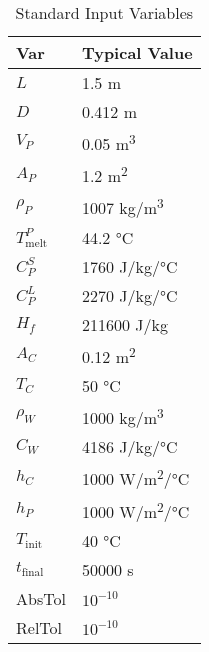 \documentclass[12pt]{article}
\begin{document}
\begin{table}
\renewcommand{\arraystretch}{1.2}
\caption{Standard Input Variables} \label{TblInputVar}
~\newline
\centering
\noindent \begin{tabular}{l l} 
  \toprule
  \textbf{Var} & \textbf{Typical Value}\\
  \midrule
  $L$	& 1.5 \si[per-mode=symbol]	{\metre}
  \\
  $D$	& 0.412 \si[per-mode=symbol] {\metre}	
  \\
  $V_P$ & 0.05 \si[per-mode=symbol] {\cubic\metre}	
  \\
  $A_P$ & 1.2 \si[per-mode=symbol] {\square\metre}	
  \\
  $\rho_P$ & 1007 \si[per-mode=symbol] {\kilogram\per\cubic\metre}
  \\
  $T_\text{melt}^{P}$ &	44.2 \si[per-mode=symbol] {\celsius} 
  \\
  $C_P^S$ & 1760 \si[per-mode=symbol] {\joule\per\kilo\gram\per\celsius}
  \\
  $C_P^L$ & 2270 \si[per-mode=symbol] {\joule\per\kilo\gram\per\celsius} 
  \\
  $H_f$ & 211600 \si[per-mode=symbol] {\joule\per\kilo\gram} 
  \\
  $A_C$ & 0.12 \si[per-mode=symbol] {\square\metre}
  \\
  $T_C$	& 50 \si[per-mode=symbol] {\celsius}
  \\
  $\rho_W$ & 1000 \si[per-mode=symbol] {\kilo\gram\per\cubic\metre} 
  \\
  $C_W$ & 4186 \si[per-mode=symbol] {\joule\per\kilo\gram\per\celsius}
  \\
  $h_C$ & 1000 \si[per-mode=symbol] {\watt\per\square\metre\per\celsius}
  \\
  $h_P$ & 1000 \si[per-mode=symbol] {\watt\per\square\metre\per\celsius} 
  \\
  $T_\text{init}$ & 40 \si[per-mode=symbol] {\celsius} 
  \\
  $t_\text{final}$ & 50000 \si[per-mode=symbol] {\second} 
  \\
  AbsTol & $10^{-10}$
  \\
  RelTol & $10^{-10}$
  \\
  \bottomrule
\end{tabular}
\end{table}

\newpage
\end{document}
